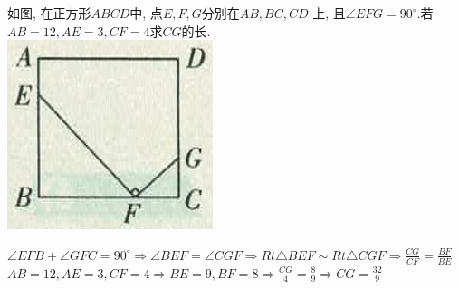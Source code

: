 \documentclass[cn,blue,12pt]{elegantbook}
\begin{document}
\begin{zsyd}
\begin{liti}[resume]
    \item 如图, 在正方形\(ABCD\)中, 点\(E,F,G\)分别在\(AB,BC,CD\) 上, 且\(\angle EFG = 90 ^\circ\).若 \(AB = 12,AE = 3,CF=4\)求\(CG\)的长.\\
        \includegraphics[width=0.2\linewidth]{pic/20200514016.png}\\
\begin{solution}
            \(\angle EFB + \angle GFC = 90^\circ \Rightarrow \angle BEF = \angle CGF \Rightarrow Rt\triangle BEF \sim Rt\triangle CGF \Rightarrow \frac{CG}{CF}=\frac{BF}{BE}\)\\
            \(AB =12, AE=3,CF=4 \Rightarrow BE = 9, BF=8 \Rightarrow \frac{CG}{4}=\frac{8}{9}\Rightarrow CG = \frac{32}{9}\)
\end{solution}
    \end{liti}
\end{zsyd}
\end{document}
